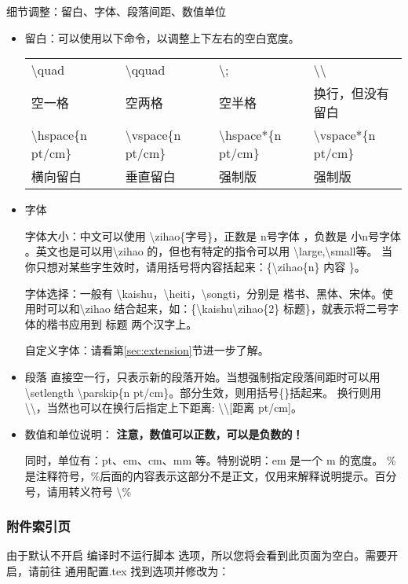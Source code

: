 \documentclass[a4paper,12pt]{ctexart}
\newenvironment{ul}{
	\begin{itemize}[topsep=0pt,labelsep=.5em,leftmargin=4.5em,itemsep=-.5em]
	}{\end{itemize}}
\newcommand{\emp}[1]{
	\colorbox{spanbg}{#1}
}
\begin{document}
	细节调整：留白、字体、段落间距、数值单位
	\begin{ul}
		\item 留白：可以使用以下命令，以调整上下左右的空白宽度。
		\begin{table}[!ht]
			\centering
			\begin{tabular}{l|l|l|l}
				\hline
				\textbackslash quad & \textbackslash qquad & \textbackslash ; & \textbackslash \textbackslash\\ 
				空一格 & 空两格 & 空半格 & 换行，但没有留白\\ \hline
				\textbackslash hspace\{n pt/cm\} & \textbackslash vspace\{n pt/cm\}&
				\textbackslash hspace*\{n pt/cm\} & \textbackslash vspace*\{n pt/cm\}\\
				横向留白& 垂直留白& 强制版& 强制版\\
				\hline
			\end{tabular}
		\end{table}
		\item 字体
		
		字体大小：中文可以使用 \textbackslash zihao\{字号\}，正数是\emp{n号字体}，负数是\emp{小n号字体}。英文也是可以用\textbackslash zihao 的，但也有特定的指令可以用 \textbackslash large,\textbackslash small等。
		当你只想对某些字生效时，请用括号将内容括起来：\{\textbackslash zihao\{n\} 内容 \}。 
		
		字体选择：一般有 \textbackslash kaishu，\textbackslash heiti，\textbackslash songti，分别是 楷书、黑体、宋体。使用时可以和\textbackslash zihao 结合起来，如：\{\textbackslash kaishu\textbackslash zihao\{2\} 标题\}，就表示将二号字体的楷书应用到\emp{标题}两个汉字上。
		
		自定义字体：请看第\ref{sec:extension}节进一步了解。
		
		\item 段落
		直接空一行，只表示新的段落开始。当想强制指定段落间距时可以用 \textbackslash setlength \textbackslash parskip\{n pt/cm\}。部分生效，则用括号\{\}括起来。
		换行则用 \textbackslash\textbackslash，当然也可以在换行后指定上下距离: \textbackslash\textbackslash[距离 pt/cm]。
		
		\item 数值和单位说明：
		\textbf{注意，数值可以正数，可以是负数的！}
		
		同时，单位有：pt、em、cm、mm 等。特别说明：em 是一个\emp{m}的宽度。\emp{\%} 是注释符号，\%后面的内容表示这部分不是正文，仅用来解释说明提示。百分号，请用转义符号\emp{\textbackslash \%}
	\end{ul}
	\subsubsection{附件索引页}
	由于默认不开启\emp{编译时不运行脚本}选项，所以您将会看到此页面为空白。需要开启，请前往\emp{通用配置.tex}找到选项并修改为：
	\begin{latexcode}
	\def\theAttachIndexScriptEmbededNeed{true}
	\end{latexcode}
	
\end{document}
